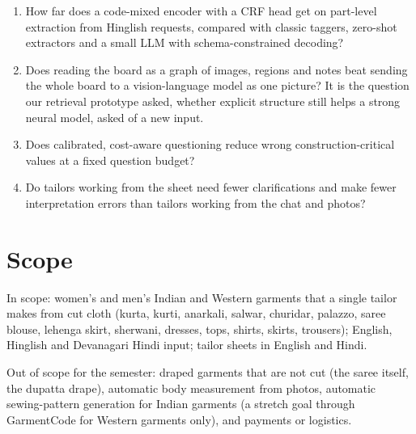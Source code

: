 \begin{enumerate}
\item[RQ1.] How far does a code-mixed encoder with a CRF head get on part-level extraction from Hinglish requests, compared with classic taggers, zero-shot extractors and a small LLM with schema-constrained decoding?
\item[RQ2.] Does reading the board as a graph of images, regions and notes beat sending the whole board to a vision-language model as one picture? It is the question our retrieval prototype asked, whether explicit structure still helps a strong neural model, asked of a new input.
\item[RQ3.] Does calibrated, cost-aware questioning reduce wrong construction-critical values at a fixed question budget?
\item[RQ4.] Do tailors working from the sheet need fewer clarifications and make fewer interpretation errors than tailors working from the chat and photos?
\end{enumerate}

\section{Scope}

In scope: women's and men's Indian and Western garments that a single tailor makes from cut cloth (kurta, kurti, anarkali, salwar, churidar, palazzo, saree blouse, lehenga skirt, sherwani, dresses, tops, shirts, skirts, trousers); English, Hinglish and Devanagari Hindi input; tailor sheets in English and Hindi.

Out of scope for the semester: draped garments that are not cut (the saree itself, the dupatta drape), automatic body measurement from photos, automatic sewing-pattern generation for Indian garments (a stretch goal through GarmentCode for Western garments only), and payments or logistics.
